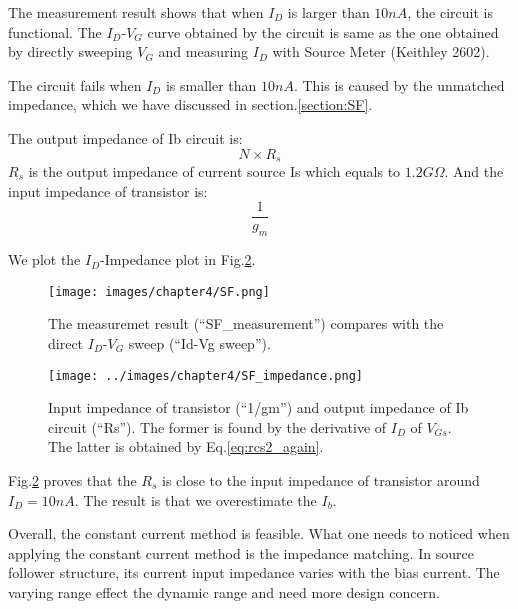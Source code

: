 The measurement result shows that when $I_D$ is larger than $10n A$, the circuit is functional.
The $I_D$-$V_G$ curve obtained by the circuit is same as the one obtained by directly sweeping $V_G$ and measuring $I_D$ with Source Meter (Keithley 2602).

The circuit fails when $I_D$ is smaller than $10n A$.
This is caused by the unmatched impedance, which we have discussed in section.\ref{section:SF}.

The output impedance of Ib circuit is:
\begin{equation} \label{eq:rcs2_again}
    N\times R_s
\end{equation}
$R_s$ is the output impedance of current source Is which equals to $1.2G\Omega$.
And the input impedance of transistor is:
\begin{equation} \label{eq:rsf2_again}
    \frac{1}{g_m}
\end{equation}

We plot the $I_D$-Impedance plot in Fig.\ref{fig:SF_imp}.


 \begin{figure}[!htbp]
    \centering
    \texttt{[image: images/chapter4/SF.png]}
    \caption{The measuremet result (``SF\_measurement'') compares with the direct $I_D$-$V_G$ sweep (``Id-Vg sweep'').}
    \label{fig:SF_result}
\end{figure}

\begin{figure}[!htbp]
   \centering
   \texttt{[image: ../images/chapter4/SF\_impedance.png]}
   \caption{Input impedance of transistor (``1/gm'') and output impedance of Ib circuit (``Rs''). The former is found by the derivative of $I_D$ of $V_{Gs}$. The latter is obtained by Eq.\ref{eq:rcs2_again}.}
   \label{fig:SF_imp}
\end{figure}

Fig.\ref{fig:SF_imp} proves that the $R_s$ is close to the input impedance of transistor around $I_D = 10n A$.
The result is that we overestimate the $I_b$.

Overall, the constant current method is feasible.
What one needs to noticed when applying the constant current method is the impedance matching.
In source follower structure, its current input impedance varies with the bias current.
The varying range effect the dynamic range and need more design concern.


